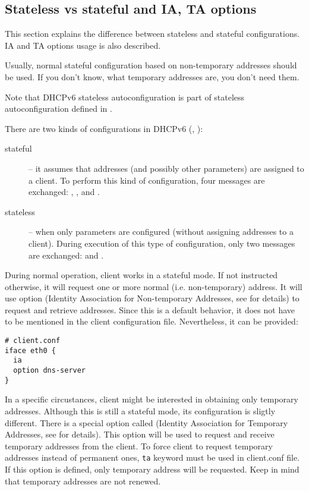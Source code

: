 \subsection{Stateless vs stateful and IA, TA options}
\label{feature-stateless-stateful}
This section explains the difference between stateless and stateful
configurations. IA and TA options usage is also described.

Usually, normal stateful configuration based on non-temporary
addresses should be used. If you don't know, what temporary addresses
are, you don't need them.

Note that DHCPv6 stateless autoconfiguration is part of stateless autoconfiguration
defined in \cite{rfc4862}.

There are two kinds of configurations in DHCPv6 (\cite{rfc3315},
\cite{rfc3736}):
\begin{description}
  \item[stateful] -- it assumes that addresses (and possibly other
    parameters) are assigned to a client. To perform this kind of
    configuration, four messages are exchanged: ,
    ,  and .
  \item[stateless] -- when only parameters are configured (without
    assigning addresses to a client). During execution of this type of
    configuration, only two messages are exchanged: 
    and .
\end{description}

During normal operation, client works in a stateful mode. If not
instructed otherwise, it will request one or more normal
(i.e. non-temporary) address. It will use  option (Identity
Association for Non-temporary Addresses, see \cite{rfc3315} for
details) to request and retrieve addresses. Since this is a default
behavior, it does not have to be mentioned in the client configuration
file. Nevertheless, it can be provided:

\begin{lstlisting}
# client.conf
iface eth0 {
  ia
  option dns-server
}
\end{lstlisting}

In a specific circustances, client might be interested in obtaining
only temporary addresses. Although this is still a stateful mode, its
configuration is sligtly different. There is a special option called
 (Identity Association for Temporary Addresses, see
\cite{rfc3315} for details). This option will be used to request and
receive temporary addresses from the client. To force client to
request temporary addresses instead of permanent ones, \verb+ta+
keyword must be used in client.conf file. If this option is defined,
only temporary address will be requested. Keep in mind that temporary
addresses are not renewed.

